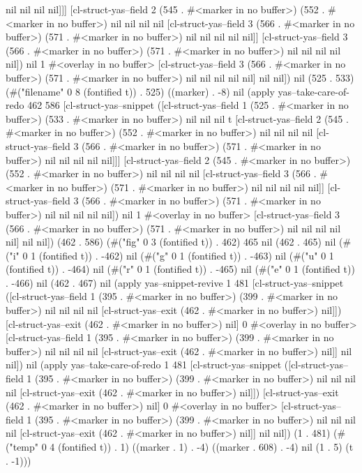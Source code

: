 nil nil nil nil]]] [cl-struct-yas--field 2 (545 . #<marker in no buffer>) (552 . #<marker in no buffer>) nil nil nil nil [cl-struct-yas--field 3 (566 . #<marker in no buffer>) (571 . #<marker in no buffer>) nil nil nil nil nil]] [cl-struct-yas--field 3 (566 . #<marker in no buffer>) (571 . #<marker in no buffer>) nil nil nil nil nil]) nil 1 #<overlay in no buffer> [cl-struct-yas--field 3 (566 . #<marker in no buffer>) (571 . #<marker in no buffer>) nil nil nil nil nil] nil nil]) nil (525 . 533) (#("filename" 0 8 (fontified t)) . 525) ((marker) . -8) nil (apply yas--take-care-of-redo 462 586 [cl-struct-yas--snippet ([cl-struct-yas--field 1 (525 . #<marker in no buffer>) (533 . #<marker in no buffer>) nil nil nil t [cl-struct-yas--field 2 (545 . #<marker in no buffer>) (552 . #<marker in no buffer>) nil nil nil nil [cl-struct-yas--field 3 (566 . #<marker in no buffer>) (571 . #<marker in no buffer>) nil nil nil nil nil]]] [cl-struct-yas--field 2 (545 . #<marker in no buffer>) (552 . #<marker in no buffer>) nil nil nil nil [cl-struct-yas--field 3 (566 . #<marker in no buffer>) (571 . #<marker in no buffer>) nil nil nil nil nil]] [cl-struct-yas--field 3 (566 . #<marker in no buffer>) (571 . #<marker in no buffer>) nil nil nil nil nil]) nil 1 #<overlay in no buffer> [cl-struct-yas--field 3 (566 . #<marker in no buffer>) (571 . #<marker in no buffer>) nil nil nil nil nil] nil nil]) (462 . 586) (#("fig" 0 3 (fontified t)) . 462) 465 nil (462 . 465) nil (#("i" 0 1 (fontified t)) . -462) nil (#("g" 0 1 (fontified t)) . -463) nil (#("u" 0 1 (fontified t)) . -464) nil (#("r" 0 1 (fontified t)) . -465) nil (#("e" 0 1 (fontified t)) . -466) nil (462 . 467) nil (apply yas--snippet-revive 1 481 [cl-struct-yas--snippet ([cl-struct-yas--field 1 (395 . #<marker in no buffer>) (399 . #<marker in no buffer>) nil nil nil nil [cl-struct-yas--exit (462 . #<marker in no buffer>) nil]]) [cl-struct-yas--exit (462 . #<marker in no buffer>) nil] 0 #<overlay in no buffer> [cl-struct-yas--field 1 (395 . #<marker in no buffer>) (399 . #<marker in no buffer>) nil nil nil nil [cl-struct-yas--exit (462 . #<marker in no buffer>) nil]] nil nil]) nil (apply yas--take-care-of-redo 1 481 [cl-struct-yas--snippet ([cl-struct-yas--field 1 (395 . #<marker in no buffer>) (399 . #<marker in no buffer>) nil nil nil nil [cl-struct-yas--exit (462 . #<marker in no buffer>) nil]]) [cl-struct-yas--exit (462 . #<marker in no buffer>) nil] 0 #<overlay in no buffer> [cl-struct-yas--field 1 (395 . #<marker in no buffer>) (399 . #<marker in no buffer>) nil nil nil nil [cl-struct-yas--exit (462 . #<marker in no buffer>) nil]] nil nil]) (1 . 481) (#("temp" 0 4 (fontified t)) . 1) ((marker . 1) . -4) ((marker . 608) . -4) nil (1 . 5) (t . -1)))
